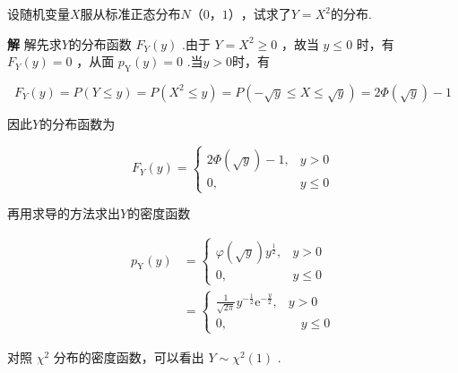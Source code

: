 \begin{example}
	设随机变量$ X $服从标准正态分布$ N（0，1） $，试求了$ Y=X^{2} $的分布.
	
	\textbf{解} 解先求$ Y $的分布函数 $F_{Y}(y)$ .由于 $Y=X^{2} \geqslant 0$ ，故当 $y \leqslant 0$ 时，有 $F_{Y}(y)=0$ ，从面 $p_{\mathrm{Y}}(y)=0$ .当$ y>0 $时，有
	
	\[
	F_{Y}(y)=P(Y \leqslant y)=P\left(X^{2} \leqslant y\right)=P(-\sqrt{y} \leqslant X \leqslant \sqrt{y})=2 \Phi(\sqrt{y})-1
	\]
	
	因此$ Y $的分布函数为
	
	\[
	F_{Y}(y)=\left\{\begin{array}{cl}{2 \Phi(\sqrt{y})-1,} & {y>0} \\ {0,} & {y \leqslant 0}\end{array}\right.
	\]
	
	再用求导的方法求出$ Y $的密度函数
	
	\[
	\begin{array}{ll}
	{p_{\mathrm{Y}}(y)} & {=\left\{
		\begin{array}{cc}
		{\varphi(\sqrt{y}) y^{\frac{1}{2}},} & {y>0} \\ 
		{0,} & {y \leqslant 0}
		\end{array}\right.}\\
	{} & {=\left\{
		\begin{array}{ll}
		{\frac{1}{\sqrt{2 \pi}} y^{-\frac{1}{2}} \mathrm{e}^{-\frac{y}{2}},} &  {y>0} \\ 
		{0,} &  {\quad y \leqslant 0}
		\end{array}\right.}
	\end{array}
	\]
	
	对照 $\chi^{2}$ 分布的密度函数，可以看出 $Y \sim \chi^{2}(1)$ .	
\end{example}

